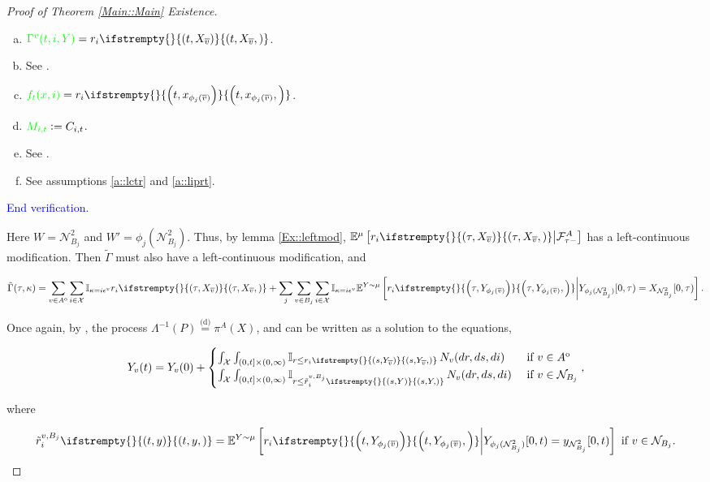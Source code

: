 \documentclass[12pt]{article}
\newcommand{\mb}{\mathbb}
\newcommand{\mc}{\mathcal}
\newcommand{\ov}{\overline}
\newcommand{\te}{\text}
\newcommand{\ep}{\epsilon}
\newcommand{\tb}{\textcolor{blue}}
\newcommand{\tg}{\textcolor{green}}
\newcommand{\ind}{\hspace{24pt}}
\newcommand{\exmu}[2]{\mb{E}^{#1}\left[#2\right]}	%
\newcommand{\deq}{\overset{\text{(d)}}{=}}			%
\newcommand{\defeq}{:=}								%
\newcommand{\sta}{\mc{X}}							%
\newcommand{\neigh}[1]{\mc{N}_{#1}}				%
\newcommand{\dneigh}[1]{\mc{N}^2_{#1}}			%
\newcommand{\cl}[1]{\ov{#1}}						%
\newcommand{\Xf}{X}									%
\newcommand{\poiss}{N}								%
\newcommand{\rate}{r}								%
\newcommand{\F}{\mc{F}}								%
\newcommand{\m}{\mu}								%
\newcommand{\proj}{\pi}								%
\newcommand{\xf}{x}									%
\newcommand{\xg}{y}									%
\newcommand{\poissv}[1]{_{#1}}						%
\newcommand{\vind}[1]{_{#1}}						%
\newcommand{\tme}[1]{(#1)}							%
\newcommand{\tmi}[1]{#1}							%
\newcommand{\vpara}[1]{^{#1}}						%
\newcommand{\stpara}[1]{_{#1}}						%
\newcommand{\tpara}[1]{_{#1}}						%
\newcommand{\jumpibd}[2]{C_{#1,#2}}					%
\newcommand{\tmepro}[3]{
\ifstrempty{#3}{
	\left(#1,#2\right)}{
	\left(#1,#2,#3\right)}}							%
\newcommand{\Xg}{Y}									%
\newcommand{\brate}{\alt{\rate}}					%
\newcommand{\inte}[1]{{#1}^\mathrm{o}}				%
\newcommand{\alt}[1]{\tilde{#1}}					%
\newcommand{\pmap}{\Lambda}							%
\newcommand{\rt}{\tau}								%
\renewcommand{\mark}{\kappa}						%
\newcommand{\ratee}{\Gamma}							%
\newcommand{\cratee}{\alt{\ratee}}					%
\newcommand{\rp}{P}									%
\newcommand{\ev}[1]{\ep^{#1}}						%
\newcommand{\const}{M}								%
\newcommand{\sttpara}[2]{_{#1,#2}}					%
\newcommand{\vjpara}[2]{^{#1,#2}}					%
\begin{document}
\begin{proof}[Proof of Theorem \ref{Main::Main} Existence]
\begin{enumerate}[(a)]
\item \(\tg{\ratee\vpara{v}(t,i,\Xg)} = \rate\stpara{i}\tmepro{t}{\Xf\vind{\cl{v}}}{}\).

\item See \cite[assumption \ref{F-a::bddr}]{F}.

\item \(\tg{f_t(\xf,i)} = \rate\stpara{i}\tmepro{t}{\xf\vind{\phi_j(\cl{v})}}{}\).

\item \(\tg{\const\sttpara{i}{t}} \defeq \jumpibd{i}{t}\).

\item See \cite[assumption \ref{F-a::bddr}]{F}.

\item See assumptions \ref{a::lctr} and \ref{a::liprt}.
\end{enumerate}

\tb{End verification.}

\ind Here \(W = \dneigh{B_j}\) and \(W' = \phi_j(\dneigh{B_j})\). Thus, by lemma \ref{Ex::leftmod}, \(\exmu{\m}{\rate\stpara{i}\tmepro{\rt}{\Xf\vind{\cl{v}}}{}\middle|\F\vpara{A}\tpara{\rt-}}\) has a left-continuous modification. Then \(\cratee\) must also have a left-continuous modification, and 

\[\cratee(\rt,\mark) = \sum_{v \in \inte{A}}\sum_{i\in \sta} \mb{I}_{\mark = i\ev{v}}\rate\stpara{i}\tmepro{\rt}{\Xf\vind{\cl{v}}}{} + \sum_j\sum_{v \in B_j}\sum_{i \in \sta} \mb{I}_{\mark = i\ev{v}}\exmu{\Xg\sim \m}{\rate\stpara{i}\tmepro{\rt}{\Xg\vind{\phi_j(\cl{v})}}{}\middle|\Xg\vind{\phi_j(\dneigh{B_j})}\tmi{[0,\rt)} = \Xf\vind{\dneigh{B_j}}\tmi{[0,\rt)}}.\]

Once again, by \cite[Exercise 14.7.1]{DalVer08}, the process \(\pmap^{-1}(\rp) \deq \proj\vpara{A}(\Xf)\), and can be written as a solution to the equations,

\[\Xg\vind{v}\tme{t} = \Xg\vind{v}\tme{0} + \begin{cases}
\int_\sta\int_{(0,t]\times (0,\infty)} \mb{I}_{r \leq \rate\stpara{i}\tmepro{s}{\Xg\vind{\cl{v}}}{}}\,\poiss\poissv{v}(dr,ds,di) &\te{ if } v \in \inte{A}\\
\int_\sta\int_{(0,t]\times (0,\infty)} \mb{I}_{r \leq \brate\vjpara{v}{B_j}\stpara{i}\tmepro{s}{\Xg}{}}\,\poiss\poissv{v}(dr,ds,di) &\te{ if } v \in \neigh{B_j}
\end{cases},\]

where

\[\brate\vjpara{v}{B_j}\stpara{i}\tmepro{t}{\xg}{} = \exmu{\Xg\sim \m}{\rate\stpara{i}\tmepro{t}{\Xg\vind{\phi_j(\cl{v})}}{}\middle|\Xg\vind{\phi_j(\dneigh{B_j})}\tmi{[0,t)} = \xg\vind{\dneigh{B_j}}\tmi{[0,t)}}\te{ if } v \in \neigh{B_j}.\]

\end{proof}
\end{document}
